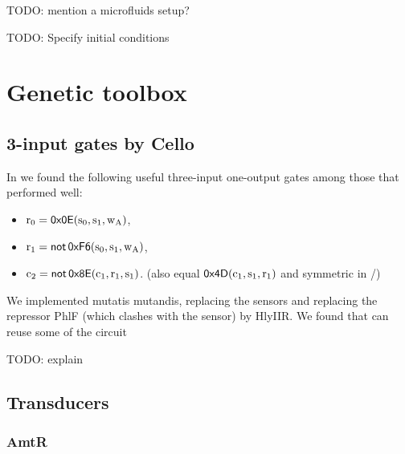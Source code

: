 \documentclass[12pt,notitlepage]{article}
\newcommand{\TODO}[1]{\textrm{\color{red}TODO: #1}}
\newcommand{\NOT}{\ensuremath{\mathop{\mathsf{not}}}\xspace}
\begin{document}
\TODO{mention a microfluids setup?}


\TODO{Specify initial conditions}


\section{Genetic toolbox} \label{s:genetic}


\subsection{3-input gates by Cello} \label{ss:cello}

In
\cite{NielsenETAL2016}
we found the following 
useful three-input one-output gates
among those that performed well:
%
\begin{itemize}
\item
    $
    	\ce{r_0} = 
    	\mathop{\mathsf{0x0E}}
    	(\ce{s_0}, \ce{s_1}, \ce{w_A})
    $,
\item
    $
    	\ce{r_1} =
    	\NOT
    	\mathop{\mathsf{0xF6}}
    	(\ce{s_0}, \ce{s_1}, \ce{w_A})
    $,
\item
    $
    	\ce{c_2} 
    	=
    	\NOT
    	\mathop{\mathsf{0x8E}}
    	(\ce{c_1}, \ce{r_1}, \ce{s_1})
    $.
    \hfill
    (also equal
    $
       	\mathop{\mathsf{0x4D}}
       	(\ce{c_1}, \ce{s_1}, \ce{r_1}) 
    $
    and
    symmetric in /)
\end{itemize}


We implemented  mutatis mutandis,
replacing the sensors 
and
replacing the repressor PhlF 
(which clashes with the  sensor) 
by HlyIIR.
%
%
We found that  can reuse 
some of the circuit


%
\TODO{explain}





\subsection{Transducers}


\subsubsection*{AmtR}
\end{document}
